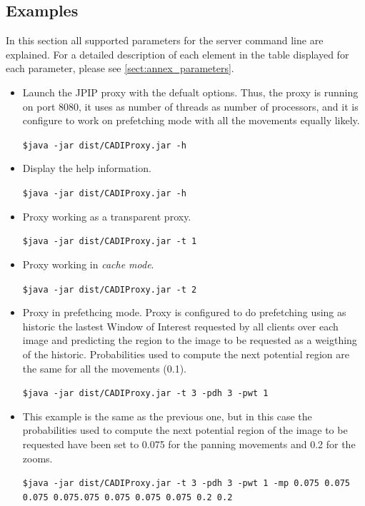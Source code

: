 \documentclass[a4paper,10pt]{article}
\begin{document}
\subsection{Examples}
\label{sect:proxy_examples}

In this section all supported parameters for the server command line are explained.
For a detailed description of each element in the table displayed for each parameter,
please see \ref{sect:annex_parameters}.


\begin{itemize}

	\item Launch the JPIP proxy with the defualt options. Thus, the proxy is running on port 8080, it uses as number of threads as number of processors, and it is configure to work on prefetching mode with all the movements equally likely.
	\begin{framed}
	\texttt{\$java -jar dist/CADIProxy.jar -h}
	\end{framed}

	\item Display the help information.
	\begin{framed}
	\texttt{\$java -jar dist/CADIProxy.jar -h}
	\end{framed}
	
	\item Proxy working as a transparent proxy.
	\begin{framed}
	\texttt{\$java -jar dist/CADIProxy.jar -t 1}
	\end{framed}
	
	\item Proxy working in \emph{cache mode}.
	\begin{framed}
	\texttt{\$java -jar dist/CADIProxy.jar -t 2}
	\end{framed}
	
	\item Proxy in prefethcing mode. Proxy is configured to do prefetching using as historic the lastest Window of Interest requested by all clients over each image and predicting the region to the image to be requested as a weigthing of the historic. Probabilities used to compute the next potential region are the same for all the movements (0.1).
	\begin{framed}
	\texttt{\$java -jar dist/CADIProxy.jar -t 3 -pdh 3 -pwt 1}
	\end{framed}
	
	\item This example is the same as the previous one, but in this case the probabilities used to compute the next potential region of the image to be requested have been set to 0.075 for the panning movements and 0.2 for the zooms.
	\begin{framed}
	\texttt{\$java -jar dist/CADIProxy.jar -t 3 -pdh 3 -pwt 1 -mp 0.075 0.075 0.075 0.075.075 0.075 0.075 0.075  0.2 0.2}
	\end{framed}
	

\end{itemize}
\end{document}
